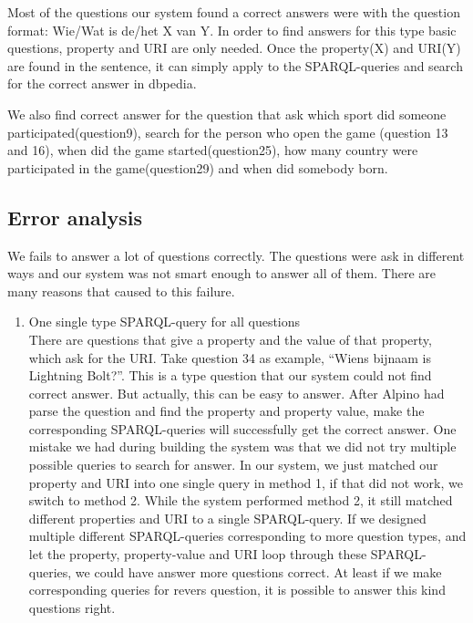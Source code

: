 \documentclass[a4paper,11pt]{article}
\begin{document}
Most of the questions our system found a correct answers were with the question format: Wie/Wat is de/het X van Y. In order to find answers for this type basic questions, property and URI are only needed. Once the property(X) and URI(Y) are found in the sentence, it can simply apply to the SPARQL-queries and search for the correct answer in dbpedia.

We also find correct answer for the question that ask which sport did someone participated(question9), search for the person who open the game (question 13 and 16), when did the game started(question25), how many country were participated in the game(question29) and when did somebody born.


%
%
%
%
%
%
%


\subsection{Error analysis}
We fails to answer a lot of questions correctly. The questions were ask in different ways and our system was not smart enough to answer all of them. There are many reasons that caused to this failure.

\begin{enumerate}
\item One single type SPARQL-query for all questions \\
There are questions that give a property and the value of that property, which ask for the URI. Take question 34 as example, “Wiens bijnaam is Lightning Bolt?”. This is a type question that our system could not find correct answer. But actually, this can be easy to answer. After Alpino had parse the question and find the property and property value, make the corresponding SPARQL-queries will successfully get the correct answer. One mistake we had during building the system was that we did not try multiple possible queries to search for answer. In our system, we just matched our property and URI into one single query in method 1, if that did not work, we switch to method 2. While the system performed method 2, it still matched different properties and URI to a single SPARQL-query. If we designed multiple different SPARQL-queries corresponding to more question types, and let the property, property-value and URI loop through these SPARQL-queries, we could have answer more questions correct. At least if we make corresponding queries for revers question, it is possible to answer this kind questions right.
\end{enumerate}




\end{document}
